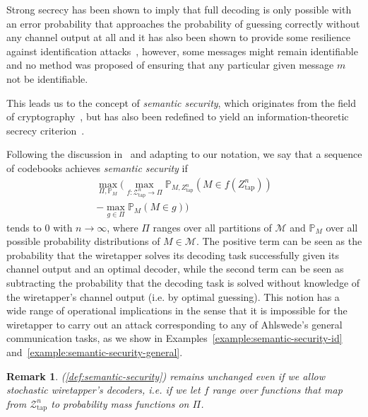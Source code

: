\documentclass[journal]{IEEEtran}
\newcommand{\channelOut}{Z}
\newcommand{\channelOutAlph}{\mathcal{Z}}
\newcommand{\channelOutAlphWiretapper}{\channelOutAlph_\mathrm{tap}}
\newcommand{\channelOutWiretapper}{\channelOut_\mathrm{tap}}
\newcommand{\codebookBlocklength}{n}
\newcommand{\Probability}{\mathbb{P}}
\newcommand{\messageRV}{M}
\newcommand{\messageAlphabet}{\mathcal{M}}
\newcommand{\messageAlphabetElement}{m}
\newcommand{\partition}{{\Pi}}
\newcommand{\wiretapperDecoder}{{f}}
\newcommand{\wiretapperGuesser}{{g}}
\newtheorem{remark}{Remark}
\begin{document}
Strong secrecy has been shown to imply that full decoding is only possible with an error probability that approaches the probability of guessing correctly without any channel output at all and it has also been shown to provide some resilience against identification attacks~\cite{BjelakovicSecrecy}, however, some messages might remain identifiable and no method was proposed of ensuring that any particular given message $\messageAlphabetElement$ not be identifiable.

This leads us to the concept of \emph{semantic security}, which originates from the field of cryptography~\cite{GoldwasserProbabilistic}, but has also been redefined to yield an information-theoretic secrecy criterion~\cite{BellareSemantic}\cite{BellareCryptographic}.

Following the discussion in~\cite{BellareCryptographic} and adapting to our notation, we say that a sequence of codebooks achieves \emph{semantic security} if
\begin{multline}
\label{def:semantic-security}
\max\limits_{\partition, \Probability_\messageRV} \bigg(
  \max\limits_{\wiretapperDecoder: \channelOutAlphWiretapper^\codebookBlocklength \rightarrow \partition}
  \Probability_{\messageRV, \channelOutWiretapper^\codebookBlocklength}(\messageRV \in \wiretapperDecoder(\channelOutWiretapper^\codebookBlocklength))
  \\
  -
  \max\limits_{\wiretapperGuesser \in \partition}
  \Probability_{\messageRV}(\messageRV \in \wiretapperGuesser)
\bigg)
\end{multline}
tends to $0$ with $\codebookBlocklength \rightarrow \infty$, where $\partition$ ranges over all partitions of $\messageAlphabet$ and $\Probability_\messageRV$ over all possible probability distributions of $\messageRV \in \messageAlphabet$. The positive term can be seen as the probability that the wiretapper solves its decoding task successfully given its channel output and an optimal decoder, while the second term can be seen as subtracting the probability that the decoding task is solved without knowledge of the wiretapper's channel output (i.e. by optimal guessing). This notion has a wide range of operational implications in the sense that it is impossible for the wiretapper to carry out an attack corresponding to any of Ahlswede's general communication tasks, as we show in Examples~\ref{example:semantic-security-id} and~\ref{example:semantic-security-general}.
\begin{remark}
(\ref{def:semantic-security}) remains unchanged even if we allow stochastic wiretapper's decoders, i.e. if we let $\wiretapperDecoder$ range over functions that map from $\channelOutAlphWiretapper^\codebookBlocklength$ to probability mass functions on $\partition$.
\end{remark}
\end{document}
